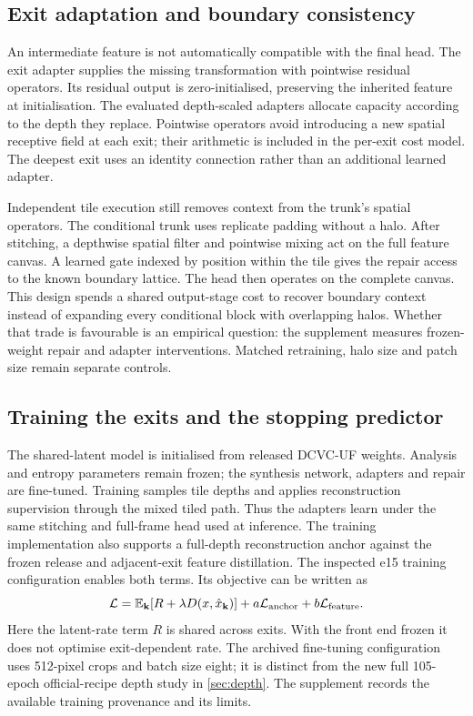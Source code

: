 \subsection{Exit adaptation and boundary consistency}

An intermediate feature is not automatically compatible with the final head.
The exit adapter supplies the missing transformation with pointwise residual
operators. Its residual output is zero-initialised, preserving the inherited
feature at initialisation. The evaluated depth-scaled adapters allocate
capacity according to the depth they replace. Pointwise operators avoid
introducing a new spatial receptive field at each exit; their arithmetic is
included in the per-exit cost model. The deepest exit uses an identity
connection rather than an additional learned adapter.

Independent tile execution still removes context from the trunk's spatial
operators. The conditional trunk uses replicate padding without a halo.
After stitching, a depthwise spatial filter and pointwise mixing act on the
full feature canvas. A learned gate indexed by position within the tile
gives the repair access to the known boundary lattice. The head then operates
on the complete canvas. This design spends a shared output-stage cost to
recover boundary context instead of expanding every conditional block with
overlapping halos. Whether that trade is favourable is an empirical question:
the supplement measures frozen-weight repair and adapter interventions.
Matched retraining, halo size and patch size remain separate controls.

\subsection{Training the exits and the stopping predictor}

The shared-latent model is initialised from released DCVC-UF weights.
Analysis and entropy parameters remain frozen; the synthesis network,
adapters and repair are fine-tuned. Training samples tile depths and applies
reconstruction supervision through the mixed tiled path. Thus the adapters
learn under the same stitching and full-frame head used at inference. The
training implementation also supports a full-depth reconstruction anchor
against the frozen release and adjacent-exit feature distillation.
The inspected e15 training configuration enables both terms. Its objective can be written as
\begin{equation}
 \mathcal L=\mathbb E_{\mathbf k}\!\left[R+\lambda D(x,\hat x_{\mathbf k})\right]
 +a\mathcal L_{\rm anchor}+b\mathcal L_{\rm feature}.
 \label{eq:training}
\end{equation}
Here the latent-rate term $R$ is shared across exits. With the front end
frozen it does not optimise exit-dependent rate. The archived fine-tuning
configuration uses 512-pixel crops and batch size eight; it is distinct from
the new full 105-epoch official-recipe depth study in \cref{sec:depth}.
The supplement records the available training provenance and its limits.

